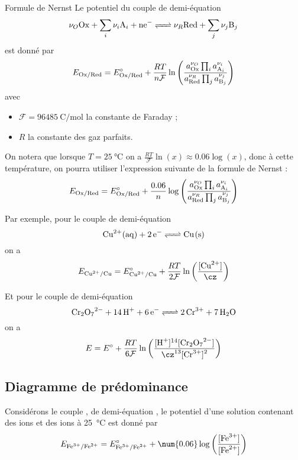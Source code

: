 \documentclass{cours}
\begin{document}
\begin{loi}{Formule de Nernst}
Le potentiel du couple de demi-équation 
\begin{equation}
  \nu_O\ce{Ox} + \sum_i \nu_i \ce{A_i} + \ce{ne-} \ce{<=>} \nu_R \ce{Red} + \sum_j \nu_j \ce{B_j}
\end{equation}
est donné par 
\begin{equation}
  E_{\ce{Ox/Red}} = E^\circ_{\ce{Ox/Red}} + \frac{RT}{n\mathcal{F}} \ln \left( \frac{a_{\ce{Ox}}^{\nu_O}\prod_i a_{\ce{A_i}}^{\nu_i}}{a_{\ce{Red}}^{\nu_R}\prod_j a_{\ce{B_j}}^{\nu_j}} \right)
\end{equation}
avec
\begin{itemize}
  \item $\mathcal{F}=\SI{96485}{\coulomb\per\mole}$ la constante de Faraday ;
  \item $R$ la constante des gaz parfaits.
\end{itemize}
\end{loi}

On notera que lorsque $T=\SI{25}{\celsius}$ on a $\frac{RT}{\mathcal{F}}\ln(x)\approx \num{0.06}\log(x)$, donc à cette température, on pourra utiliser l'expression suivante de la formule de Nernst :
\begin{equation}
  E_{\ce{Ox/Red}} = E^\circ_{\ce{Ox/Red}} + \frac{0.06}{n} \log \left( \frac{a_{\ce{Ox}}^{\nu_O}\prod_i a_{\ce{A_i}}^{\nu_i}}{a_{\ce{Red}}^{\nu_R}\prod_j a_{\ce{B_j}}^{\nu_j}} \right)
\end{equation}

Par exemple, pour le couple  de demi-équation 
\begin{equation}
  \ce{Cu^2+(aq) + 2e- <=> Cu(s)}
\end{equation}
on a 
\begin{equation}
  E_{\ce{Cu^2+/Cu}} =  E^\circ_{\ce{Cu^2+/Cu}} + \frac{RT}{2\mathcal{F}}\ln \left( \frac{[\ce{Cu^2+}]}{\cz} \right)
\end{equation}

Et pour le couple  de demi-équation 
\begin{equation}
  \ce{Cr2O7^2- + 14H+ + 6e- <=> 2Cr^3+ + 7H2O}
\end{equation}
on a
\begin{equation}
  E = E^\circ + \frac{RT}{6\mathcal{F}} \ln \left( \frac{[\ce{H+}]^{14}[\ce{Cr2O7^2-}]}{\cz^{13} [\ce{Cr^3+]^2}} \right)
\end{equation}

\subsection{Diagramme de prédominance}%
\label{sub:diagramme_de_predominance}
Considérons le couple , de demi-équation , le potentiel d'une solution contenant des ions  et des ions  à \SI{25}{\celsius} est donné par
\begin{equation}
  E_{\ce{Fe^3+/Fe^2+}} = E^\circ_{\ce{Fe^3+/Fe^2+}} + \num{0.06} \log \left(\frac{[\ce{Fe^3+]}}{[\ce{Fe^2+}]}\right)
\end{equation} 
\end{document}
